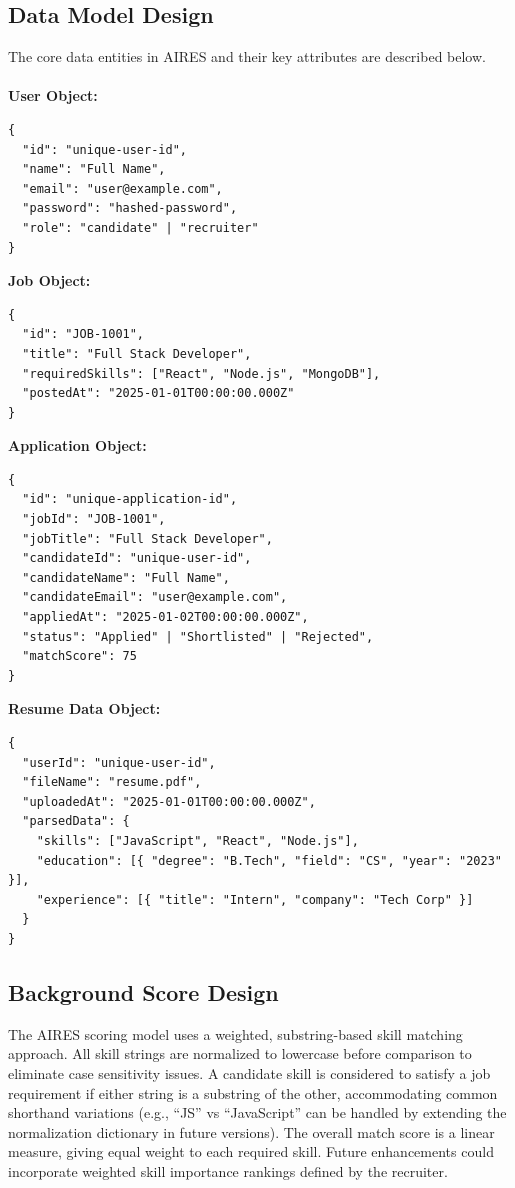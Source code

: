 \subsection{Data Model Design}
The core data entities in AIRES and their key attributes are described below.\\\\
\textbf{User Object:}
\begin{lstlisting}[style=csharpstyle]
{
  "id": "unique-user-id",
  "name": "Full Name",
  "email": "user@example.com",
  "password": "hashed-password",
  "role": "candidate" | "recruiter"
}
\end{lstlisting}

\textbf{Job Object:}
\begin{lstlisting}[style=csharpstyle]
{
  "id": "JOB-1001",
  "title": "Full Stack Developer",
  "requiredSkills": ["React", "Node.js", "MongoDB"],
  "postedAt": "2025-01-01T00:00:00.000Z"
}
\end{lstlisting}

\textbf{Application Object:}
\begin{lstlisting}[style=csharpstyle]
{
  "id": "unique-application-id",
  "jobId": "JOB-1001",
  "jobTitle": "Full Stack Developer",
  "candidateId": "unique-user-id",
  "candidateName": "Full Name",
  "candidateEmail": "user@example.com",
  "appliedAt": "2025-01-02T00:00:00.000Z",
  "status": "Applied" | "Shortlisted" | "Rejected",
  "matchScore": 75
}
\end{lstlisting}

\textbf{Resume Data Object:}
\begin{lstlisting}[style=csharpstyle]
{
  "userId": "unique-user-id",
  "fileName": "resume.pdf",
  "uploadedAt": "2025-01-01T00:00:00.000Z",
  "parsedData": {
    "skills": ["JavaScript", "React", "Node.js"],
    "education": [{ "degree": "B.Tech", "field": "CS", "year": "2023" }],
    "experience": [{ "title": "Intern", "company": "Tech Corp" }]
  }
}
\end{lstlisting}

\subsection{Background Score Design}
The AIRES scoring model uses a weighted, substring-based skill matching approach. All skill strings are normalized to lowercase before comparison to eliminate case sensitivity issues. A candidate skill is considered to satisfy a job requirement if either string is a substring of the other, accommodating common shorthand variations (e.g., ``JS'' vs ``JavaScript'' can be handled by extending the normalization dictionary in future versions). The overall match score is a linear measure, giving equal weight to each required skill. Future enhancements could incorporate weighted skill importance rankings defined by the recruiter.

